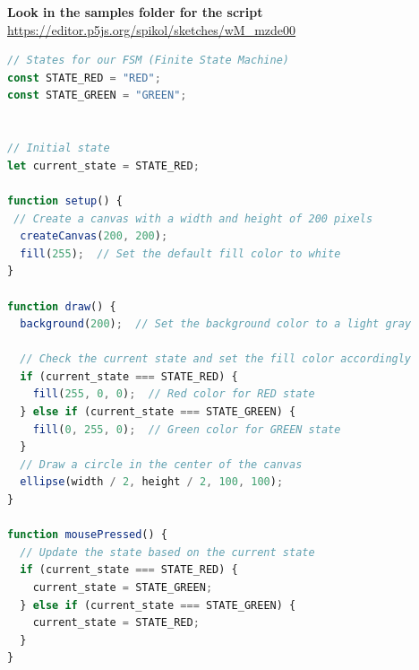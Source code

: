 \newpage
{}


\begin{exercisebox}[adjusted title= Finite state machines - Traffic Light]
\textbf{Look in the samples folder for the script}
\mbox{\url{https://editor.p5js.org/spikol/sketches/wM_mzde00}}

\begin{lstlisting}[language=JavaScript]
// States for our FSM (Finite State Machine)
const STATE_RED = "RED";
const STATE_GREEN = "GREEN";


// Initial state
let current_state = STATE_RED;

function setup() {
 // Create a canvas with a width and height of 200 pixels
  createCanvas(200, 200); 
  fill(255);  // Set the default fill color to white
}

function draw() {
  background(200);  // Set the background color to a light gray
  
  // Check the current state and set the fill color accordingly
  if (current_state === STATE_RED) {
    fill(255, 0, 0);  // Red color for RED state
  } else if (current_state === STATE_GREEN) {
    fill(0, 255, 0);  // Green color for GREEN state
  } 
  // Draw a circle in the center of the canvas
  ellipse(width / 2, height / 2, 100, 100);  
}

function mousePressed() {
  // Update the state based on the current state
  if (current_state === STATE_RED) {
    current_state = STATE_GREEN;
  } else if (current_state === STATE_GREEN) {
    current_state = STATE_RED;
  } 
}
\end{lstlisting}
\end{exercisebox}

